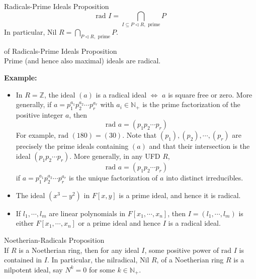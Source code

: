 \begin{proposition}{Radicals-Prime Ideals Proposition}\\
\[
\text{rad }I = \bigcap_{I \subseteq P \triangleleft R, \text{ prime}} P
\]
In particular, $\text{Nil } R= \bigcap_{P \triangleleft R, \text{ prime}} P$.
\end{proposition}

\begin{corollary}{of Radicals-Prime Ideals Proposition}\\
Prime (and hence also maximal) ideals are radical.
\end{corollary}

\noindent\textbf{Example:} \begin{itemize}
    \item In $R=\mathbb{Z}$, the ideal $(a)$ is a radical ideal $\Leftrightarrow$ $a$ is square free or zero. More generally, if $a= p_1^{a_1} p_2^{a_2} \cdots p_{r}^{a_r}$ with $a_i\in \mathbb{N}_+$ is the prime factorization of the positive integer $a$, then
    $$\text{rad }a= (p_1p_2 \cdots p_r)$$
    For example, $\text{rad }(180)= (30)$. Note that $(p_1) ,(p_2) ,\cdots, (p_r)$ are precisely the prime ideals containing $(a)$ and that their intersection is the ideal $(p_1p_2 \cdots p_r)$. More generally, in any UFD $R$,
    $$\text{rad }a= (p_1p_2 \cdots p_r)$$
    if $a=p_1^{a_1}p_2^{a_2} \cdots p_r^{a_r}$ is the unique factorization of $a$ into distinct irreducibles.

    \item The ideal $(x^3-y^2)$ in $F[x,y]$ is a prime ideal, and hence it is radical.
    \item If $l_1 ,\cdots, l_m$ are linear polynomials in $F[x_1 ,\cdots, x_n]$, then $I= (l_1 ,\cdots, l_m)$ is either $F[x_1 ,\cdots, x_n]$ or a prime ideal and hence $I$ is a radical ideal.
\end{itemize}

\begin{proposition}{Noetherian-Radicals Proposition}\\
If $R$ is a Noetherian ring, then for any ideal $I$, some positive power of $\text{rad }I$ is contained in $I$. In particular, the nilradical, $\text{Nil }R$, of a Noetherian ring $R$ is a nilpotent ideal, say $N^k=0$ for some $k\in \mathbb{N}_+$.
\end{proposition}

